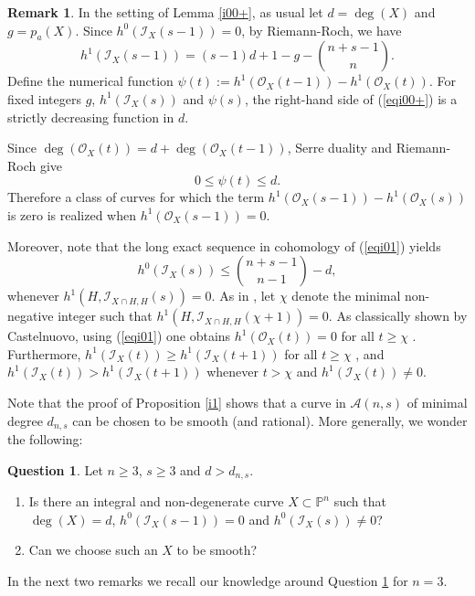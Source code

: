 \documentclass[a4, 11pt]{amsart}
\theoremstyle{plain}
\theoremstyle{definition}
\newtheorem{remark}[theorem]{Remark}
\newtheorem{question}[theorem]{Question}
\newcommand{\enm}[1]{\ensuremath{#1}}          %
\newcommand{\cal}[1]{\mathcal{#1}}
\newcommand{\PP}{\enm{\mathbb{P}}}
\newcommand{\Ii}{\enm{\cal{I}}}
\newcommand{\Oo}{\enm{\cal{O}}}
\begin{document}
\begin{remark}\label{qw00}
In the setting of Lemma \ref{i00+}, as usual let $d = \deg (X)$ and $g = p_a(X)$. 
Since $h^0(\Ii _X(s-1)) =0$, by Riemann-Roch, we have 
\[
h^1(\Ii _X(s-1)) = (s-1)d +1-g-\binom{n+s-1}{n}.
\] 
Define the numerical function $\psi (t) := h^1(\Oo _X(t-1)) -h^1(\Oo _X(t))$. For fixed integers $g$, $h^1(\Ii _X(s))$ and $\psi(s)$, the right-hand side of (\ref{eqi00+}) is a strictly decreasing function in $d$.

Since $\deg (\Oo _X(t)) =d+\deg (\Oo _X(t-1))$, Serre duality and Riemann-Roch give 
\[
0\le \psi (t) \le d.
\]
Therefore a class of curves for which the term $h^1(\Oo _X(s-1)) -h^1(\Oo _X(s))$ is zero is realized when $h^1(\Oo _X(s-1)) =0$.

Moreover, note that the long exact sequence in cohomology of (\ref{eqi01}) yields
\[
h^0(\Ii _X(s)) \le \binom{n+s-1}{n-1} -d,
\] 
whenever $h^1(H,\Ii _{X\cap H,H}(s)) =0$. As in \cite[Chapter 3]{szp}, let $\chi$ denote the minimal non-negative integer such that $h^1(H,\Ii _{X\cap H,H}(\chi +1)) =0$. As classically shown by Castelnuovo, using (\ref{eqi01}) one obtains $h^1(\Oo _X(t)) =0$ for all $t\ge \chi$ \cite[Theorem 1, p. 52]{szp}.
Furthermore, $h^1(\Ii _X(t)) \ge h^1(\Ii _X(t+1))$ for all $t\ge \chi$ \cite[Lemma 2, p. 53]{szp}, 
and $h^1(\Ii _X(t))> h^1(\Ii _X(t+1))$ whenever $t>\chi$ and $h^1(\Ii _X(t))\ne 0$.


\end{remark}

Note that the proof of Proposition \ref{i1} shows that a curve in $\mathcal A(n,s)$ of minimal degree $d_{n,s}$ can be chosen to be smooth (and rational). 
More generally, we wonder the following: 

\begin{question}\label{xq1}
Let $n\ge 3$, $s\ge 3$ and $d> d_{n,s}$. 
\begin{enumerate}
\item[(i)] Is there an integral and non-degenerate curve $X\subset \PP^n$ such that $\deg (X)=d$, $h^0(\Ii _X(s-1)) =0$ and
$h^0(\Ii _X(s))\ne 0$?
\item[(ii)] Can we choose such an $X$ to be smooth?
\end{enumerate}
\end{question}

In the next two remarks we recall our knowledge around Question \ref{xq1} for $n=3$. 
\end{document}
